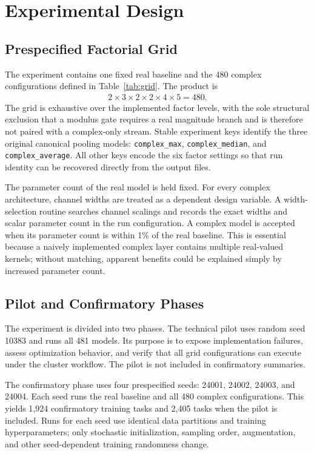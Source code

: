 \documentclass[journal]{IEEEtran}
\begin{document}
\section{Experimental Design}\label{sec:design}
\subsection{Prespecified Factorial Grid}
The experiment contains one fixed real baseline and the 480 complex configurations defined in Table~\ref{tab:grid}. The product is
\begin{align}
2\times3\times2\times2\times4\times5=480.
\end{align}
The grid is exhaustive over the implemented factor levels, with the sole structural exclusion that a modulus gate requires a real magnitude branch and is therefore not paired with a complex-only stream. Stable experiment keys identify the three original canonical pooling models: \texttt{complex\_max}, \texttt{complex\_median}, and \texttt{complex\_average}. All other keys encode the six factor settings so that run identity can be recovered directly from the output files.

The parameter count of the real model is held fixed. For every complex architecture, channel widths are treated as a dependent design variable. A width-selection routine searches channel scalings and records the exact widths and scalar parameter count in the run configuration. A complex model is accepted when its parameter count is within 1\% of the real baseline. This is essential because a naively implemented complex layer contains multiple real-valued kernels; without matching, apparent benefits could be explained simply by increased parameter count.

\subsection{Pilot and Confirmatory Phases}
The experiment is divided into two phases. The technical pilot uses random seed 10383 and runs all 481 models. Its purpose is to expose implementation failures, assess optimization behavior, and verify that all grid configurations can execute under the cluster workflow. The pilot is not included in confirmatory summaries.

The confirmatory phase uses four prespecified seeds: 24001, 24002, 24003, and 24004. Each seed runs the real baseline and all 480 complex configurations. This yields 1,924 confirmatory training tasks and 2,405 tasks when the pilot is included. Runs for each seed use identical data partitions and training hyperparameters; only stochastic initialization, sampling order, augmentation, and other seed-dependent training randomness change.
\end{document}
